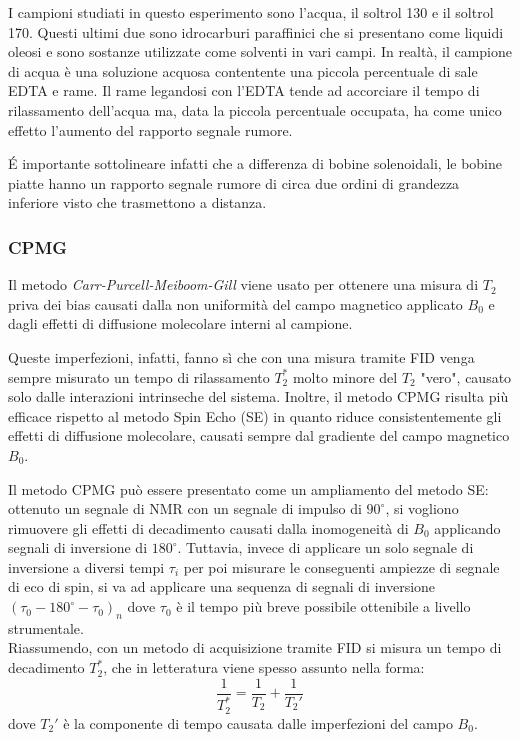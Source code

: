 I campioni studiati in questo esperimento sono l'acqua, il soltrol 130 e il soltrol 170.
Questi ultimi due sono idrocarburi paraffinici che si presentano come liquidi oleosi e sono sostanze utilizzate come solventi in vari campi.
In realtà, il campione di acqua è una soluzione acquosa contentente una piccola percentuale di sale EDTA e rame.
Il rame legandosi con l'EDTA tende ad accorciare il tempo di rilassamento dell'acqua ma, data la piccola percentuale occupata, ha come unico effetto l'aumento del rapporto segnale rumore.

\'E importante sottolineare infatti che a differenza di bobine solenoidali, le bobine piatte hanno un rapporto segnale rumore di circa due ordini di grandezza inferiore visto che trasmettono a distanza.

\subsubsection*{CPMG}
Il metodo \textit{Carr-Purcell-Meiboom-Gill} viene usato per ottenere una misura di $T_2$ priva dei bias causati dalla non uniformità del campo magnetico applicato $B_0$ e dagli effetti di diffusione molecolare interni al campione.

Queste imperfezioni, infatti, fanno sì che con una misura tramite FID venga sempre misurato un tempo di rilassamento $T_2^*$ molto minore del $T_2$ "vero", causato solo dalle interazioni intrinseche del sistema. Inoltre, il metodo CPMG risulta più efficace rispetto al metodo Spin Echo (SE) in quanto riduce consistentemente gli effetti di diffusione molecolare, causati sempre dal gradiente del campo magnetico $B_0$.

Il metodo CPMG può essere presentato come un ampliamento del metodo SE: ottenuto un segnale di NMR con un segnale di impulso di $90^\circ$, si vogliono rimuovere gli effetti di decadimento causati dalla inomogeneità di $B_0$ applicando segnali di inversione di $180^\circ$. Tuttavia, invece di applicare un solo segnale di inversione a diversi tempi $\tau_i$ per poi misurare le conseguenti ampiezze di segnale di eco di spin, si va ad applicare una sequenza di segnali di inversione $(\tau_0 - 180^\circ - \tau_0)_n$ dove $\tau_0$ è il tempo più breve possibile ottenibile a livello strumentale.\\

Riassumendo, con un metodo di acquisizione tramite FID si misura un tempo di decadimento $T_2^*$, che in letteratura viene spesso assunto nella forma:
\begin{equation}
	\frac{1}{T_2^*} = \frac{1}{T_2} +\frac{1}{T_2'}
\end{equation}
dove $T_2'$ è la componente di tempo causata dalle imperfezioni del campo $B_0$.

